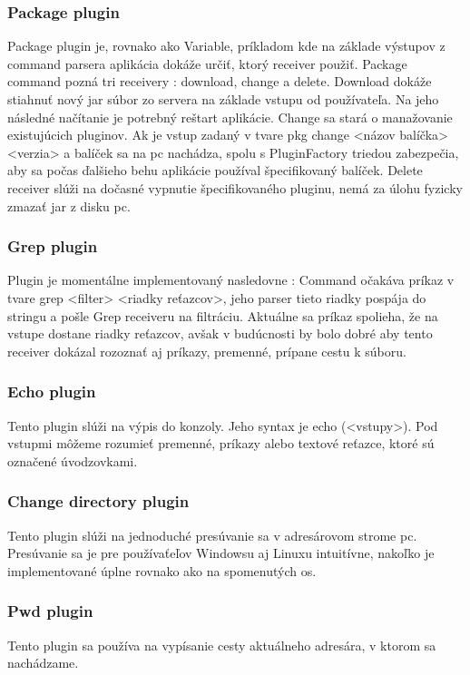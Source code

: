 \subsubsection{Package plugin}
\indent Package plugin je, rovnako ako Variable, príkladom kde na základe výstupov z command parsera aplikácia dokáže určiť, ktorý receiver použiť. Package command pozná tri receivery : download, change a delete. Download dokáže stiahnuť nový \acrshort{jar} súbor zo servera na základe vstupu od používateľa. Na jeho následné načítanie je potrebný reštart aplikácie. Change sa stará o manažovanie existujúcich pluginov. Ak je vstup zadaný v tvare pkg change <názov balíčka> <verzia> a balíček sa na \acrshort{pc} nachádza,  spolu s PluginFactory triedou zabezpečia, aby sa počas ďalšieho behu aplikácie používal špecifikovaný balíček. Delete receiver slúži na dočasné vypnutie špecifikovaného pluginu, nemá za úlohu fyzicky zmazať \acrshort{jar} z disku \acrshort{pc}. 
\subsubsection{Grep plugin}
\indent Plugin je momentálne implementovaný nasledovne : Command očakáva príkaz v tvare grep <filter> <riadky reťazcov>, jeho parser tieto riadky pospája do stringu a pošle Grep receiveru na filtráciu. Aktuálne sa príkaz spolieha, že na vstupe dostane riadky reťazcov, avšak v budúcnosti by bolo dobré aby tento receiver dokázal rozoznať aj príkazy, premenné, prípane cestu k súboru.
\subsubsection{Echo plugin}
\indent Tento plugin slúži na výpis do konzoly. Jeho syntax je echo (<vstupy>). Pod vstupmi môžeme rozumieť premenné, príkazy alebo textové reťazce, ktoré sú označené úvodzovkami. 
\subsubsection{Change directory plugin}
\indent  Tento plugin slúži na jednoduché presúvanie sa v adresárovom strome \acrshort{pc}. Presúvanie sa je pre používaťeľov Windowsu aj Linuxu intuitívne, nakoľko je implementované úplne rovnako ako na spomenutých \acrshort{os}.
\subsubsection{Pwd plugin}
\indent  Tento plugin sa používa  na vypísanie cesty aktuálneho adresára, v ktorom sa nachádzame.
